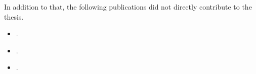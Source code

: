 In addition to that, the following publications did not directly contribute to
the thesis.

\begin{itemize}
\item {}.
\item {}.
\item {}.
\end{itemize}

